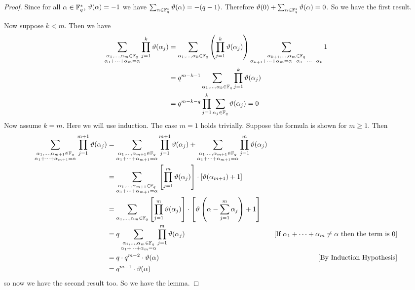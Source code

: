 \begin{proof}
  Since for all $\alpha\in\mathbb{F}_q^*$, $\vartheta(\alpha)=-1$ we have $\sum_{\alpha\in\mathbb{F}_q^*}\vartheta(\alpha)=-(q-1)$. Therefore $\vartheta(0)+\sum_{\alpha\in\mathbb{F}_q^*}\vartheta(\alpha)=0$. So we have the first result. 

  Now suppose $k<m$. Then we have \begin{align*}
    \sum_{\substack{\alpha_1,\dots,\alpha_m\in\mathbb{F}_q\\ \alpha_1+\cdots+\alpha_m=\alpha}}\prod_{j=1}^k\vartheta(\alpha_j) & = \sum_{\alpha_1,\dots,\alpha_k\in\mathbb{F}_q}\left(\prod_{j=1}^k\vartheta(\alpha_j)\right)\sum_{\substack{\alpha_{k+1},\dots,\alpha_m\in\mathbb{F}_q\\ \alpha_{k+1}+\cdots+\alpha_m=\alpha-\alpha_1-\cdots-\alpha_k}}1\\ 
    & = q^{m-k-1}\sum_{\alpha_1,\dots,\alpha_k\in\mathbb{F}_q}\prod_{j=1}^k\vartheta(\alpha_j)\\ 
    & = q^{m-k-q}\prod_{j=1}^k\sum_{\alpha_j\in\mathbb{F}_q}\vartheta(\alpha_j) =0
  \end{align*}
  Now assume $k=m$. Here we will use induction. The case $m=1$ holds trivially. Suppose the formula is shown for $m\geq 1$. Then \begin{align*}
    \sum_{\substack{\alpha_1,\dots,\alpha_{m+1}\in\mathbb{F}_q\\ \alpha_1+\cdots+\alpha_{m+1}=\alpha}}\prod_{j=1}^{m+1}\vartheta(\alpha_j) & = \sum_{\substack{\alpha_1,\dots,\alpha_{m+1}\in\mathbb{F}_q\\ \alpha_1+\cdots+\alpha_{m+1}=\alpha}}\prod_{j=1}^{m+1}\vartheta(\alpha_j)+\sum_{\substack{\alpha_1,\dots,\alpha_{m+1}\in\mathbb{F}_q\\ \alpha_1+\cdots+\alpha_{m+1}=\alpha}}\prod_{j=1}^m\vartheta(\alpha_j)\\ 
    & = \sum_{\substack{\alpha_1,\dots,\alpha_{m+1}\in\mathbb{F}_q\\ \alpha_1+\cdots+\alpha_{m+1}=\alpha}}\left[\prod_{j=1}^m\vartheta(\alpha_j)\right]\cdot [\vartheta(\alpha_{m+1})+1]\\ 
    & = \sum_{\alpha_1,\dots,\alpha_{m}\in\mathbb{F}_q}\left[\prod_{j=1}^m\vartheta(\alpha_j)\right]\cdot \left[\vartheta\left(\alpha-\sum_{j=1}^m\alpha_j\right)+1\right]\\ 
    & = q\sum_{\substack{\alpha_1,\dots,\alpha_{m}\in\mathbb{F}_q\\ \alpha_1+\cdots+\alpha_{m}=\alpha}}\prod_{j=1}^m\vartheta(\alpha_j)& [\text{If $\alpha_1+\cdots+\alpha_m\neq \alpha$ then the term is $0$}]\\ 
    & = q\cdot q^{m-2}\cdot \vartheta(\alpha) & [\text{By Induction Hypothesis}]\\ 
    & = q^{m-1}\cdot \vartheta(\alpha)
  \end{align*}
  so now we have the second result too. So we have the lemma. 
\end{proof}

